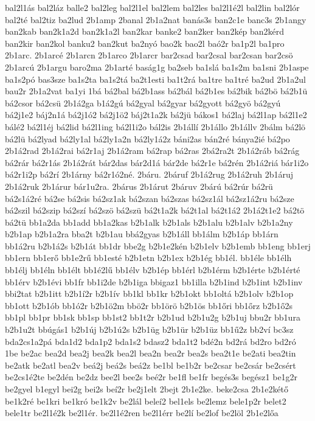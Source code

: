 {bal2l1ás
bal2láz
balle2
bal2leg
bal2l1el
bal2lem
bal2les
bal2l1é2l
bal2lin
bal2lór
bal2té
bal2tiz
ba2lud
2b1amp
2banal
2b1a2nat
banás3s
ban2c1e
banc3s
2b1angy
ban2kab
ban2k1a2d
ban2k1a2l
ban2kar
banke2
ban2ker
ban2kép
ban2kérd
ban2kir
ban2kol
banku2
ban2kut
ba2nyó
bao2k
bao2l
baó2r
ba1p2l
ba1pro
2b1arc.
2b1arcé
2b1arcn
2b1arco
2b1arcr
bar2csad
bar2csal
bar2csan
bar2csö
2b1arcú
2b1argu
baro2ma
2b1arté
baság1g
ba2seb
ba1slá
ba1s2m
ba1sni
2b1aspe
ba1s2pó
bas3sze
ba1s2ta
ba1s2tá
ba2t1esti
ba1t2rá
ba1tre
ba1tré
ba2ud
2b1a2ul
bau2r
2b1a2vat
ba1yi
1bá
bá2bal
bá2b1ass
bá2bál
bá2b1es
bá2bik
bá2bö
bá2b1ü
bá2csor
bá2csü
2b1á2ga
b1á2gú
bá2gyal
bá2gyar
bá2gyott
bá2gyö
bá2gyú
bá2j1e2
báj2n1á
bá2j1ó2
bá2j1ö2
báj2t1a2k
bá2jü
bákos1
bá2laj
bá2l1ap
bá2l1e2
bálé2
bá2l1éj
bá2lid
bá2l1ing
bá2l1i2o
bál2is
2b1állí
2b1állo
2b1állv
2bálm
bá2lö
bá2lü
bá2lyad
bá2ly1al
bá2ly1a2n
bá2ly1á2z
báni2as
bán2ré
bánya2ié
bá2po
2b1á2rad
2b1á2rai
bá2r1aj
2b1á2ram
bá2rap
bá2ras
2bá2ra2t
2b1á2ráb
bá2rág
bá2rár
bá2r1ás
2b1á2rát
bár2das
bár2d1á
bár2de
bá2r1e
bá2rén
2b1á2riá
bár1i2o
bá2r1i2p
bá2rí
2b1árny
bá2r1ó2né.
2báru.
2báruf
2b1á2rug
2b1á2ruh
2b1áruj
2b1á2ruk
2b1árur
bár1u2ra.
2bárus
2b1árut
2báruv
2bárú
bá2rúr
bá2rü
bá2s1á2ré
bá2se
bá2sis
bá2sz1ak
bá2szan
bá2szas
bá2sz1ál
bá2sz1á2ru
bá2sze
bá2szil
bá2szip
bá2szí
bá2szö
bá2szü
bá2t1a2k
bá2t1al
bá2t1á2
2b1á2t1e2
bá2tö
bá2tü
bb1a2da
bb1add
bb1a2kas
b2b1alk
b2b1als
b2b1alu
b2b1alv
b2b1a2ny
b2b1ap
b2b1a2ra
bba2t
b2b1au
bbá2gyas
b2b1áll
bb1álm
b2b1áp
bb1árn
bb1á2ru
b2b1á2s
b2b1át
bb1dr
bbe2g
b2b1e2kén
b2b1elv
b2b1emb
bb1eng
bb1erj
bb1ern
bb1erő
bb1e2rű
bb1esté
b2b1etn
b2b1ex
b2b1ég
bb1él.
bb1éle
bb1élh
bb1élj
bb1éln
bb1élt
bb1é2lű
bb1élv
b2b1ép
bb1érl
b2b1érm
b2b1érte
b2b1érté
bb1érv
b2b1évi
bb1fr
bb1i2de
b2b1iga
bbigaz1
bb1illa
b2b1ind
b2b1int
b2b1inv
bbi2tat
b2b1itt
b2b1í2r
b2b1ív
bb1kl
bb1kr
b2b1okt
bb1oltá
b2b1olv
b2b1op
bb1ott
b2b1ób
bb1ó2r
b2b1ö2m
bbö2r
bb1örö
b2b1ös
bb1őri
bb1őrz
b2b1ő2s
bb1pl
bb1pr
bb1sk
bb1sp
bb1st2
bb1t2r
b2b1ud
b2b1u2g
b2b1uj
bbu2r
bb1ura
b2b1u2t
bbúgás1
b2b1új
b2b1ú2s
b2b1üg
b2b1ür
b2b1üz
bb1ű2z
bb2ví
bc3sz
bda2cs1a2pá
bda1d2
bda1p2
bda1s2
bdasz2
bda1t2
bdé2n
bd2rá
bd2ro
bd2ró
1be
be2ac
bea2d
bea2j
bea2k
bea2l
bea2n
bea2r
bea2s
bea2t1e
be2ati
bea2tin
be2atk
be2atl
bea2v
beá2j
beá2s
beá2z
be1bl
be1b2r
be2csar
be2csár
be2csért
be2cs1é2te
be2dén
be2dz
bee2l
bee2s
beé2r
be1fl
be1fr
begés3s
begész1
be1g2r
be2gyel
b1egyl
bei2g
bei2s
beí2r
be2j1elt
2bejt
2b1e2ke.
beke2csa
2b1e2kétő
be1k2ré
be1kri
be1kró
be1k2v
be2lál
beleí2
bel1els
be2lemz
bele1p2r
belet2
bele1tr
be2l1é2k
be2l1ér.
be2l1é2ren
be2l1érr
be2lí
be2lof
be2löl
2b1e2lőa
}
